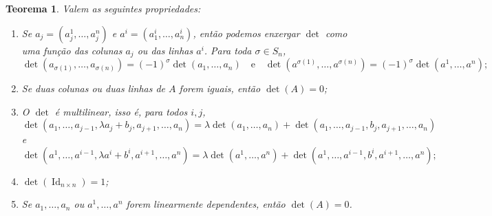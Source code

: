 \documentclass{article}
\newtheorem{theorem}[definition]{Teorema}
\DeclareMathOperator{\Id}{Id}
\begin{document}
\begin{theorem}
    Valem as seguintes propriedades:
    \begin{enumerate}
        \item Se $a_j = (a^1_j, \dots, a^n_j)$ e $a^i = (a^i_1, \dots, a^i_n)$, então podemos enxergar $\det$ como uma função das colunas $a_j$ ou das linhas $a^i$. Para toda $\sigma \in S_n$, \begin{equation}
            \det(a_{\sigma(1)}, \dots, a_{\sigma(n)}) = (-1)^\sigma \det(a_1, \dots, a_n) \quad \text{e} \quad \det(a^{\sigma(1)}, \dots, a^{\sigma(n)}) = (-1)^\sigma \det(a^1, \dots, a^n);
        \end{equation}
        \item Se duas colunas ou duas linhas de $A$ forem iguais, então $\det(A) = 0$;
        \item O $\det$ é multilinear, isso é, para todos $i, j$, \begin{equation}
            \det(a_1, \dots, a_{j-1}, \lambda a_j + b_j, a_{j + 1}, \dots, a_n) = \lambda \det(a_1, \dots, a_n) + \det(a_1, \dots, a_{j-1}, b_j, a_{j+1}, \dots, a_n)
        \end{equation} e \begin{equation}
            \det(a^1, \dots, a^{i-1}, \lambda a^i + b^i, a^{i + 1}, \dots, a^n) = \lambda \det(a^1, \dots, a^n) + \det(a^1, \dots, a^{i-1}, b^i, a^{i+1}, \dots, a^n);
        \end{equation}
        \item $\det(\Id_{n \times n}) = 1$;
        \item Se $a_1, \dots, a_n$ ou $a^1, \dots, a^n$ forem linearmente dependentes, então $\det(A) = 0$.
    \end{enumerate}
\end{theorem}
\end{document}
